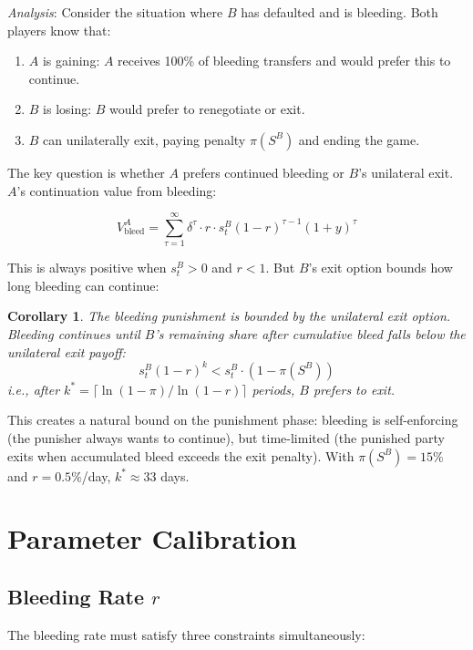 \documentclass[12pt]{article}
\newtheorem{corollary}{Corollary}
\begin{document}
\textit{Analysis}: Consider the situation where $B$ has defaulted and is bleeding. Both players know that:
\begin{enumerate}
    \item $A$ is gaining: $A$ receives 100\% of bleeding transfers and would prefer this to continue.
    \item $B$ is losing: $B$ would prefer to renegotiate or exit.
    \item $B$ can unilaterally exit, paying penalty $\pi(S^B)$ and ending the game.
\end{enumerate}

The key question is whether $A$ prefers continued bleeding or $B$'s unilateral exit. $A$'s continuation value from bleeding:

\[
V_{\text{bleed}}^A = \sum_{\tau=1}^{\infty} \delta^\tau \cdot r \cdot s_t^B (1-r)^{\tau-1}(1+y)^\tau
\]

This is always positive when $s_t^B > 0$ and $r < 1$. But $B$'s exit option bounds how long bleeding can continue:

\begin{corollary}
The bleeding punishment is bounded by the unilateral exit option. Bleeding continues until $B$'s remaining share after cumulative bleed falls below the unilateral exit payoff:
\[
s_t^B(1-r)^k < s_t^B \cdot (1 - \pi(S^B))
\]
i.e., after $k^* = \lceil \ln(1-\pi) / \ln(1-r) \rceil$ periods, $B$ prefers to exit.
\end{corollary}

This creates a natural bound on the punishment phase: bleeding is self-enforcing (the punisher always wants to continue), but time-limited (the punished party exits when accumulated bleed exceeds the exit penalty). With $\pi(S^B) = 15\%$ and $r = 0.5\%$/day, $k^* \approx 33$ days.



\section{Parameter Calibration}

\subsection{Bleeding Rate $r$}

The bleeding rate must satisfy three constraints simultaneously:
\end{document}
